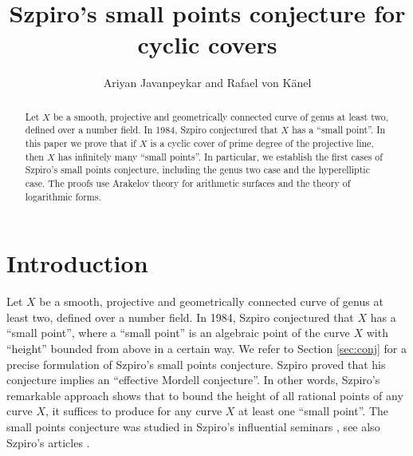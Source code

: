 \documentclass[11pt]{article}
\date{}
\numberwithin{equation}{section}
\begin{document}
\author{Ariyan Javanpeykar and Rafael von K\"anel}
\title{Szpiro's small points conjecture for cyclic covers}
\maketitle








\begin{abstract}
\small Let $X$ be a smooth, projective and geometrically connected curve of genus at least two, defined over a number field. In 1984, Szpiro conjectured that $X$  has a  ``small point''.  
In this paper we prove that if $X$ is a cyclic cover of prime degree of the projective line, then $X$ has infinitely many ``small points''. In particular, we establish the first cases of Szpiro's small points conjecture, including the genus two case and the hyperelliptic case. The proofs use Arakelov theory for arithmetic surfaces and the theory of logarithmic forms.
\end{abstract}




\section{Introduction}\label{sec:intro}



Let $X$ be a smooth, projective and geometrically connected curve of genus at least two, defined over a number field. In 1984, Szpiro \cite{szpiro:faltings} conjectured that  $X$ has a ``small point'', where a ``small point'' is an algebraic point of the curve $X$ with ``height'' bounded from above in a certain way. We refer to Section \ref{sec:conj} for a precise formulation of Szpiro's small points conjecture.
Szpiro  proved that his conjecture implies  an ``effective Mordell conjecture''. 
In other words, Szpiro's remarkable approach shows that to bound the height of all rational points of any curve $X$, it suffices to produce for any curve $X$ at least one ``small point''.
The small points conjecture was studied in Szpiro's influential seminars \cite{szpiro:spa,szpiro:spe}, see also Szpiro's articles \cite{szpiro:lefschetz,szpiro:grothendieck}. 
\end{document}
